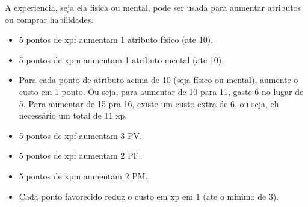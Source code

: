 A experiencia, seja ela fisica ou mental, pode ser usada para aumentar atributos ou comprar habilidades. 

\begin{itemize}
\item 5 pontos de xpf aumentam 1 atributo físico (ate 10).
\item 5 pontos de xpm aumentam 1 atributo mental (ate 10).
\item Para cada ponto de atributo acima de 10 (seja físico ou mental), aumente o custo em 1 ponto. Ou seja, para aumentar de 10 para 11, gaste 6 no lugar de 5. Para aumentar de 15 pra 16, existe um custo extra de 6, ou seja, eh necessário um total de 11 xp.
\item 5 pontos de xpf aumentam 3 PV.
\item 5 pontos de xpf aumentam 2 PF.
\item 5 pontos de xpm aumentam 2 PM.
\item Cada ponto favorecido reduz o custo em xp em 1 (ate o mínimo de 3).
\end{itemize}




